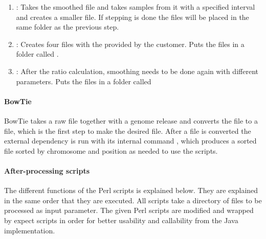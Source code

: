 \begin{enumerate}
\item {}: Takes the smoothed  file and takes samples from it
with a specified interval and creates a smaller  file. If stepping is done the files will be placed in the same folder as the previous step.

\item {}: Creates four  files with the
provided by the customer. Puts the files in a folder called .

\item {}: After the ratio calculation, smoothing needs to be done
again with different parameters. Puts the files in a folder called
\end{enumerate}



\paragraph{BowTie}
BowTie takes a raw  file together with a genome release and converts the  file to a  file, which is the first step to make the desired  file.
After a  file is converted the external dependency  is run with its internal command , which produces a sorted  file sorted by chromosome and position as needed to use the scripts.
\paragraph{After-processing scripts}
The different functions of the Perl scripts is explained below. They are explained in the same order that they are executed. All scripts take a directory of files to be processed as input parameter.
The given Perl scripts are modified and wrapped by expect scripts in order for better usability and callability from the Java implementation.
